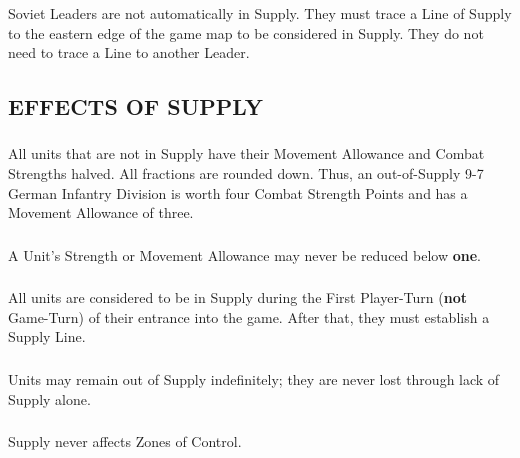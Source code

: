 \subsubsection{} Soviet Leaders are not automatically in Supply. They must trace a Line of Supply to the eastern edge of the game map to be considered in Supply. They do not need to trace a Line to another Leader.

\subsection{EFFECTS OF SUPPLY}

\subsubsection{} All units that are not in Supply have their Movement Allowance and Combat Strengths halved. All fractions are rounded down. Thus, an out-of-Supply 9-7 German Infantry Division is worth four Combat Strength Points and has a Movement Allowance of three.

\subsubsection{} A Unit's Strength or Movement Allowance may never be reduced below \textbf{one}.

\subsubsection{} All units are considered to be in Supply during the First Player-Turn (\textbf{not} Game-Turn) of their entrance into the game. After that, they must establish a Supply Line.

\subsubsection{} Units may remain out of Supply indefinitely; they are never lost through lack of Supply alone.

\subsubsection{} Supply never affects Zones of Control.
